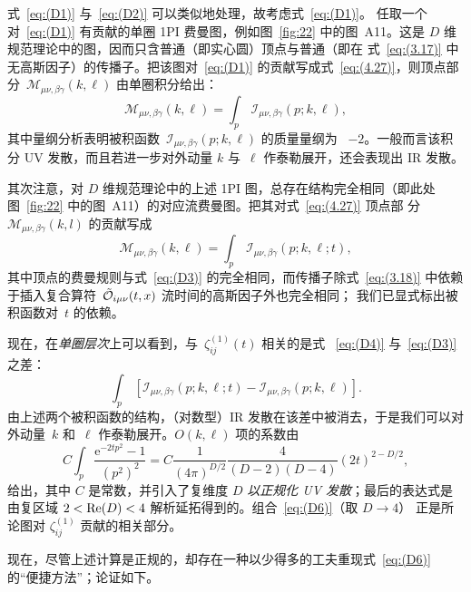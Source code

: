 式~\eqref{eq:(D1)} 与~\eqref{eq:(D2)} 可以类似地处理，故考虑式~\eqref{eq:(D1)}。
任取一个对~\eqref{eq:(D1)} 有贡献的单圈 1PI 费曼图，例如图~\ref{fig:22}
中的图~A11。这是 $D$ 维规范理论中的图，因而只含普通（即实心圆）顶点与普通（即在
式~\eqref{eq:(3.17)} 中无高斯因子）的传播子。把该图对~\eqref{eq:(D1)}
的贡献写成式~\eqref{eq:(4.27)}，则顶点部
分~$\mathcal{M}_{\mu\nu,\beta\gamma}(k,\ell)$ 由单圈积分给出：
\begin{equation}
   \mathcal{M}_{\mu\nu,\beta\gamma}(k,\ell)=\int_p\,
   \mathcal{I}_{\mu\nu,\beta\gamma}(p;k,\ell),
\label{eq:(D3)}
\end{equation}
其中量纲分析表明被积函数~$\mathcal{I}_{\mu\nu,\beta\gamma}(p;k,\ell)$ 的质量量纲为%
~$-2$。一般而言该积分 UV 发散，而且若进一步对外动量 $k$ 与~$\ell$ 作泰勒展开，还会表现出
IR 发散。

其次注意，对 $D$ 维规范理论中的上述 1PI 图，总存在结构完全相同（即此处图~\ref{fig:22}
中的图~A11）的对应流费曼图。把其对式~\eqref{eq:(4.27)} 顶点部
分~$\mathcal{M}_{\mu\nu,\beta\gamma}(k,l)$ 的贡献写成
\begin{equation}
   \mathcal{M}_{\mu\nu,\beta\gamma}(k,\ell)=\int_p\,
   \mathcal{I}_{\mu\nu,\beta\gamma}(p;k,\ell;t),
\label{eq:(D4)}
\end{equation}
其中顶点的费曼规则与式~\eqref{eq:(D3)} 的完全相同，而传播子除式~\eqref{eq:(3.18)}
中依赖于插入复合算符~$\Tilde{\mathcal{O}}_{i\mu\nu}(t,x)$ 流时间的高斯因子外也完全相同；
我们已显式标出被积函数对~$t$ 的依赖。

现在，在\emph{单圈层次\/}上可以看到，与~$\zeta^{(1)}_{ij}(t)$ 相关的是式%
~\eqref{eq:(D4)} 与~\eqref{eq:(D3)} 之差：
\begin{equation}
   \int_p\,\left[
   \mathcal{I}_{\mu\nu,\beta\gamma}(p;k,\ell;t)
   -\mathcal{I}_{\mu\nu,\beta\gamma}(p;k,\ell)\right].
\label{eq:(D5)}
\end{equation}
由上述两个被积函数的结构，（对数型）IR 发散在该差中被消去，于是我们可以对外动量~$k$
和~$\ell$ 作泰勒展开。$O(k,\ell)$ 项的系数由
\begin{equation}
   C\int_p\frac{\mathrm{e}^{-2tp^2}-1}{(p^2)^2}
   =C\frac{1}{(4\pi)^{D/2}}\frac{4}{(D-2)(D-4)}(2t)^{2-D/2},
\label{eq:(D6)}
\end{equation}
给出，其中 $C$ 是常数，并引入了复维度 $D$ \emph{以正规化 UV 发散}；最后的表达式是由复区域
$2<\re(D)<4$ 解析延拓得到的。组合~\eqref{eq:(D6)}（取 $D\to4$）
正是所论图对 $\zeta_{ij}^{(1)}$ 贡献的相关部分。

现在，尽管上述计算是正规的，却存在一种以少得多的工夫重现式~\eqref{eq:(D6)}
的“便捷方法”；论证如下。

